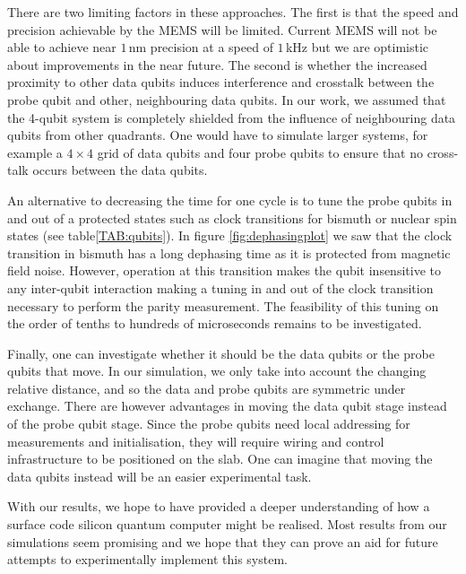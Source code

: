 There are two limiting factors in these approaches. The first is that the speed and precision achievable by the MEMS will be limited. Current MEMS will not be able to achieve near $1\, $nm precision at a speed of $1\, $kHz \cite{Koo2012,Chu2003} but we are optimistic about improvements in the near future. The second is whether the increased proximity to other data qubits induces interference and crosstalk between the probe qubit and other, neighbouring data qubits. In our work, we assumed that the 4-qubit system is completely shielded from the influence of neighbouring data qubits from other quadrants. One would have to simulate larger systems, for example a $4\times 4$ grid of data qubits and four probe qubits to ensure that no cross-talk occurs between the data qubits. 

An alternative to decreasing the time for one cycle is to tune the probe qubits in and out of a protected states such as clock transitions for bismuth or nuclear spin states (see table\@ \ref{TAB:qubits}). In figure \ref{fig:dephasingplot} we saw that the clock transition in bismuth has a long dephasing time as it is protected from magnetic field noise. However, operation at this transition makes the qubit insensitive to any inter-qubit interaction making a tuning in and out of the clock transition necessary to perform the parity measurement. The feasibility of this tuning on the order of tenths to hundreds of microseconds remains to be investigated.

Finally, one can investigate whether it should be the data qubits or the probe qubits that  move. In our simulation, we only take into account the changing relative distance, and so the data and probe qubits are symmetric under exchange. There are however advantages in moving the data qubit stage instead of the probe qubit stage. Since the probe qubits need local addressing for measurements and initialisation, they will require wiring and control infrastructure to be positioned on the slab. One can imagine that moving the data qubits instead will be an easier experimental task. 

With our results, we hope to have provided a deeper understanding of how a surface code silicon quantum computer might be realised. Most results from our simulations seem promising and we hope that they can prove an aid for future attempts to experimentally implement this system. 














